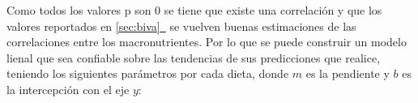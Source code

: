 \documentclass[12pt,a4paper]{article}
\newcommand{\fullref}[1]{%
  \hyperref[#1]{\cref*{#1}~\nameref*{#1}}%
}
\begin{document}
{{            %
            Como todos los valores p son $0$ se tiene que existe una correlación y que los valores 
            reportados en \fullref{sec:biva} se vuelven buenas estimaciones de las correlaciones entre los 
            macronutrientes. Por lo que se puede construir un modelo lienal que sea confiable 
            sobre las tendencias de sus predicciones que realice, teniendo los siguientes parámetros por 
            cada dieta, donde $m$ es la pendiente y $b$ es la intercepción con el eje $y$:

}}
\end{document}
